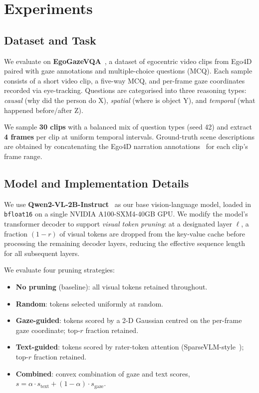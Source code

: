 
\section{Experiments}

\subsection{Dataset and Task}

We evaluate on \textbf{EgoGazeVQA}~\cite{egogaze}, a dataset of egocentric video clips from
Ego4D~\cite{ego4d} paired with gaze annotations and multiple-choice questions (MCQ).
Each sample consists of a short video clip, a five-way MCQ, and per-frame gaze coordinates
recorded via eye-tracking.
Questions are categorised into three reasoning types: \emph{causal} (why did the person do X),
\emph{spatial} (where is object Y), and \emph{temporal} (what happened before/after Z).

We sample \textbf{30 clips} with a balanced mix of question types (seed 42)
and extract \textbf{4 frames} per clip at uniform temporal intervals.
Ground-truth scene descriptions are obtained by concatenating the Ego4D
narration annotations~\cite{ego4d} for each clip's frame range.

\subsection{Model and Implementation Details}

We use \textbf{Qwen2-VL-2B-Instruct}~\cite{qwen2vl} as our base vision-language model,
loaded in \texttt{bfloat16} on a single NVIDIA A100-SXM4-40GB GPU.
We modify the model's transformer decoder to support \emph{visual token pruning}:
at a designated layer $\ell$, a fraction $(1 - r)$ of visual tokens are dropped
from the key-value cache before processing the remaining decoder layers,
reducing the effective sequence length for all subsequent layers.

We evaluate four pruning strategies:
\begin{itemize}
  \item \textbf{No pruning} (baseline): all visual tokens retained throughout.
  \item \textbf{Random}: tokens selected uniformly at random.
  \item \textbf{Gaze-guided}: tokens scored by a 2-D Gaussian centred on the
        per-frame gaze coordinate; top-$r$ fraction retained.
  \item \textbf{Text-guided}: tokens scored by rater-token attention
        (SparseVLM-style~\cite{sparsevlm}); top-$r$ fraction retained.
  \item \textbf{Combined}: convex combination of gaze and text scores,
        $s = \alpha \cdot s_{\text{text}} + (1-\alpha) \cdot s_{\text{gaze}}$.
\end{itemize}

